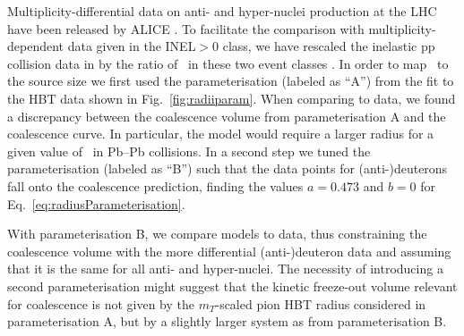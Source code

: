 \documentclass[%
 reprint,
 amsmath,amssymb,
 aps,
]{revtex4-1}
\begin{document}
Multiplicity-differential data on anti- and hyper-nuclei production at the LHC have been released by ALICE \cite{ALICE:nucleipp2017,ALICE:deuteronppPbPb2015,Acharya:2017dmc, Adam:2015yta}. 
To facilitate the comparison with multiplicity-dependent data given in the INEL$>$0 class, we have rescaled the inelastic pp collision data in \cite{ALICE:nucleipp2017} by the ratio of \avdNdeta~in these two event classes \cite{Adam:2015gka}.
In order to map \avdNdeta~to the source size we first used the parameterisation (labeled as ``A'') from the fit to the HBT data shown in Fig.~\ref{fig:radiiparam}. 
When comparing to data, we found a discrepancy between the coalescence volume from parameterisation A and the coalescence curve. 
In particular, the model would require a larger radius for a given value of \btwo~in Pb--Pb collisions.
In a second step we tuned the parameterisation (labeled as ``B'') such that the data points for (anti-)deuterons fall onto the coalescence prediction, finding the values $a = 0.473$ and $b = 0$ for Eq.~\ref{eq:radiusParameterisation}. 

With parameterisation B, we compare models to data, thus constraining the coalescence volume with the more differential (anti-)deuteron data and assuming that it is the same for all anti- and hyper-nuclei. 
The necessity of introducing a second parameterisation might suggest that the kinetic freeze-out volume relevant for coalescence is not given by the $m_{T}$-scaled pion HBT radius considered in parameterisation A, but by a slightly larger system as from parameterisation B.  
\end{document}
